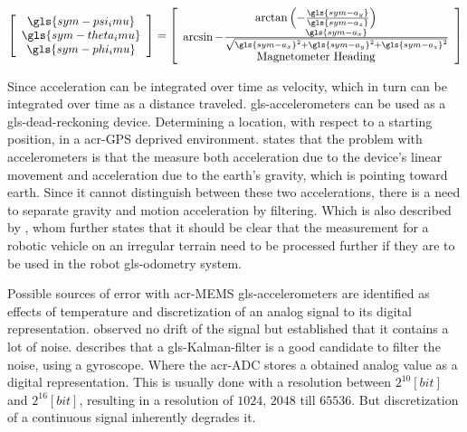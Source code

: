 \begin{equation}
    \label{eq:roll_and_pitch_accelerometer}
    \left[ \begin{array}{c}
               \gls{sym-psi_imu}   \\
               \gls{sym-theta_imu} \\
               \gls{sym-phi_imu}
    \end{array} \right] =
    \left[\begin{array}{c}
              \arctan \left(-\frac{\gls{sym-a_y}}{\gls{sym-a_z}}\right)                                   \\
              \arcsin - \frac{\gls{sym-a_x}}{\sqrt{\gls{sym-a_x}^2 + \gls{sym-a_y}^2 + \gls{sym-a_z}^2 }} \\
              \text{Magnetometer Heading}
    \end{array}\right]
\end{equation}

Since acceleration can be integrated over time as velocity, which in turn can be integrated over time as a distance
traveled. \gls{gls-accelerometer}s can be used as a \gls{gls-dead-reckoning} device. Determining a location, with
respect to a starting position, in a \gls{acr-GPS} deprived environment. \citet{abyarjoo_implementing_2015} states that
the problem with accelerometers is that the measure both acceleration due to the device's linear movement and
acceleration due to the earth's gravity, which is pointing toward earth. Since it cannot distinguish between these two
accelerations, there is a need to separate gravity and motion acceleration by filtering. Which is also described by
\citet{nistler_gravity_2011}, whom further states that it should be clear that the measurement for a robotic vehicle on
an irregular terrain need to be processed further if they are to be used in the robot \gls{gls-odometry} system.

Possible sources of error with \gls{acr-MEMS} \gls{gls-accelerometer}s are identified as effects of temperature and
discretization of an analog signal to its digital representation. \citet{abyarjoo_implementing_2015} observed no drift
of the signal but established that it contains a lot of noise. \citet{kownacki_optimization_2011} describes that a
\gls{gls-Kalman-filter} is a good candidate to filter the noise, using a gyroscope. Where the \gls{acr-ADC}
stores a obtained analog value as a digital representation. This is usually done with a resolution between \( 2^{10}
[bit] \) and \( 2^{16} [bit] \), resulting in a resolution of \( 1024 \), \( 2048 \) till \( 65536 \). But
discretization of a continuous signal inherently degrades it.

